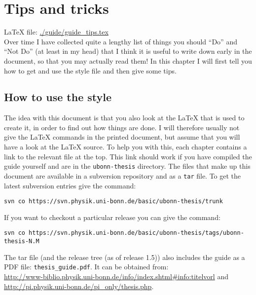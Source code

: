 \chapter{Tips and tricks}
\label{sec:tips}

\LaTeX{} file: \url{./guide/guide_tips.tex}\\[1ex]
\noindent
Over time I have collected quite a lengthy list of things you should
\enquote{Do} and \enquote{Not Do} (at least in my head) that I think
it is useful to write down early in the document, so that you may
actually read them!  In this chapter I will first tell you how to get
and use the style file and then give some tips.

\section{How to use the  style}
\label{sec:tips:howto}

The idea with this document is that you also look at the \LaTeX{} that
is used to create it, in order to find out how things are done.
I will therefore usually not give the \LaTeX{} commands in the printed
document, but assume that you will have a look at the \LaTeX{} source.
To help you with this, each chapter contains a link to the relevant
file at the top. This link should work if you have compiled the guide
yourself and are in the \texttt{ubonn-thesis} directory.
The files that make up this document are available in a subversion
repository and as a \texttt{tar} file. To get the latest subversion
entries give the command:

\begin{verbatim}
svn co https://svn.physik.uni-bonn.de/basic/ubonn-thesis/trunk
\end{verbatim}
\noindent
If you want to checkout a particular release you can give the command:
\begin{verbatim}
svn co https://svn.physik.uni-bonn.de/basic/ubonn-thesis/tags/ubonn-thesis-N.M
\end{verbatim}
\noindent
The tar file (and the release tree (as of release 1.5)) also includes
the guide as a PDF file: \texttt{thesis\_guide.pdf}.  It can be
obtained from:\\
\url{http://www-biblio.physik.uni-bonn.de/info/index.shtml#info:titelvorl}
and\\
\url{http://pi.physik.uni-bonn.de/pi_only/thesis.php}.

